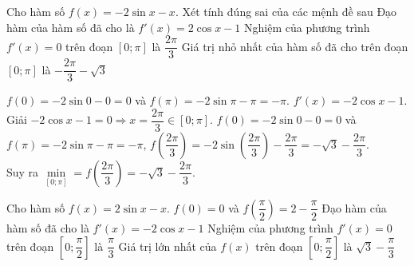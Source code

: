 \begin{ex}%
Cho hàm số $f(x)=-2\sin x-x$. Xét tính đúng sai của các mệnh đề sau
{Đạo hàm của hàm số đã cho là $f'(x)=2\cos x-1$}
{\True Nghiệm của phương trình $f'(x)=0$ trên đoạn $[0;\pi]$ là $\dfrac{2\pi}{3}$}
{\True Giá trị nhỏ nhất của hàm số đã cho trên đoạn $[0;\pi]$ là $-\dfrac{2\pi}{3}-\sqrt{3}$}
\loigiai
{
\begin{itemchoice}
\itemch  $f(0) = -2\sin 0 - 0 = 0$ và $f(\pi) = -2\sin \pi - \pi = -\pi$.
\itemch  $f'(x) = -2\cos x - 1$.
\itemch Giải $-2\cos x - 1 = 0 \Rightarrow x = \dfrac{2\pi}{3} \in [0; \pi]$.
\itemch
$f(0) = -2\sin 0 - 0 = 0$ và $f(\pi) = -2\sin \pi - \pi = -\pi$, $f\left(\dfrac{2\pi}{3}\right) = -2\sin\left(\dfrac{2\pi}{3}\right) - \dfrac{2\pi}{3} = -\sqrt{3} - \dfrac{2\pi}{3}$.\\
Suy ra $\min\limits_{[0;\pi]}=f\left(\dfrac{2\pi}{3}\right)= -\sqrt{3} - \dfrac{2\pi}{3}$.
\end{itemchoice}
}
\end{ex}

\begin{ex}%
Cho hàm số $f(x)=2\sin x-x$.
\choiceTF
{\True $f(0)=0$ và $f\left(\dfrac{\pi}{2}\right)=2-\dfrac{\pi}{2}$}
{Đạo hàm của hàm số đã cho là $f'(x)=-2\cos x-1$}
{\True Nghiệm của phương trình $f'(x)=0$ trên đoạn $\left[0;\dfrac{\pi}{2}\right]$ là $\dfrac{\pi}{3}$}
{\True Giá trị lớn nhất của $f(x)$ trên đoạn $\left[0;\dfrac{\pi}{2}\right]$ là $\sqrt{3}-\dfrac{\pi}{3}$}
\end{ex}

